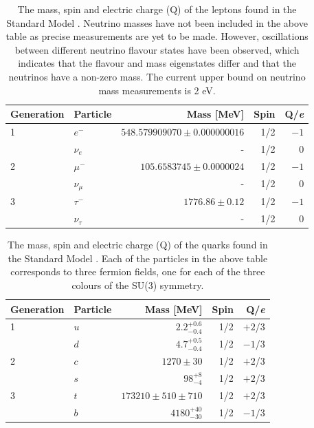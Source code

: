 \begin{table}[h!]
\centering
\begin{tabular}{l l r r r}
\hline
Generation & Particle & Mass [MeV] & Spin & Q/\textit{e} \\
\hline
1 & $e^{-}$ & $548.579909070\pm0.000000016$ & 1/2 & $-1$ \\
& $\nu_{e}$ & - & 1/2 & 0 \\
\hline
2 & $\mu^{-}$ & $105.6583745\pm0.0000024$ & 1/2 & $-1$ \\
& $\nu_{\mu}$ & - & 1/2 & 0 \\
\hline
3 & $\tau^{-}$ & $1776.86\pm0.12$ & 1/2 & $-1$ \\
& $\nu_{\tau}$ & - & 1/2 & 0 \\
\end{tabular}
\caption[The mass, spin and electric charge (Q) of the leptons found in the Standard Model \cite{Beringer:1900zz}.  Neutrino masses have not been included in the above table as precise measurements are yet to be made.  However, oscillations between different neutrino flavour states have been observed, which indicates that the flavour and mass eigenstates differ and that the neutrinos have a non-zero mass.  The current upper bound on neutrino mass measurements is 2 eV.]{The mass, spin and electric charge (Q) of the leptons found in the Standard Model \cite{Beringer:1900zz}.  Neutrino masses have not been included in the above table as precise measurements are yet to be made.  However, oscillations between different neutrino flavour states have been observed, which indicates that the flavour and mass eigenstates differ and that the neutrinos have a non-zero mass.  The current upper bound on neutrino mass measurements is 2 eV.}
\label{table:smleptons}
\end{table}
%
\begin{table}[h!]
\centering
\begin{tabular}{l l r r r}
\hline
Generation & Particle & Mass [MeV] & Spin & Q/\textit{e} \\
\hline
1 & $u$ & $2.2^{+0.6}_{-0.4}$ & 1/2 & $+2$/3 \\
 & $d$ & $4.7^{+0.5}_{-0.4}$ & 1/2 & $-1$/3 \\
\hline
2 & $c$ & $1270\pm30$ & 1/2 & $+2$/3 \\
 & $s$ & $98^{+8}_{-4}$ & 1/2 & $+2$/3 \\
\hline
3 & $t$ & $173210 \pm 510 \pm 710$ & 1/2 & $+2$/3 \\
 & $b$ & $4180^{+40}_{-30}$ & 1/2 & $-1$/3 \\
\end{tabular}
\caption[The mass, spin and electric charge (Q) of the quarks found in the Standard Model \cite{Beringer:1900zz}.  Each of the particles in the above table corresponds to three fermion fields, one for each of the three colours of the SU(3) symmetry.]{The mass, spin and electric charge (Q) of the quarks found in the Standard Model \cite{Beringer:1900zz}.  Each of the particles in the above table corresponds to three fermion fields, one for each of the three colours of the SU(3) symmetry.} 
\label{table:smquarks}
\end{table}
